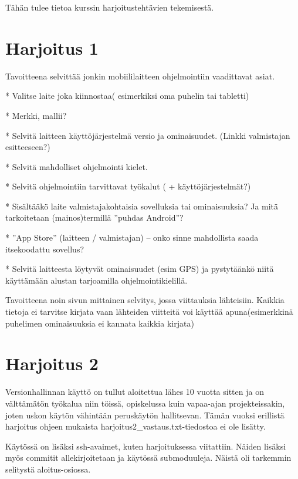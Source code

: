 
Tähän tulee tietoa kurssin harjoitustehtävien tekemisestä.


\section{Harjoitus 1}


Tavoitteena selvittää jonkin mobiililaitteen ohjelmointiin vaadittavat asiat.

* Valitse laite joka kiinnostaa( esimerkiksi oma puhelin tai tabletti)

* Merkki, mallii?

* Selvitä laitteen käyttöjärjestelmä versio ja ominaisuudet. (Linkki valmistajan esitteeseen?)

* Selvitä mahdolliset ohjelmointi kielet.

* Selvitä ohjelmointiin tarvittavat työkalut ( + käyttöjärjestelmät?)

* Sisältääkö laite valmistajakohtaisia sovelluksia tai ominaisuuksia? Ja mitä tarkoitetaan (mainos)termillä ”puhdas Android”?

* ”App Store” (laitteen / valmistajan) – onko sinne mahdollista saada itsekoodattu sovellus?

* Selvitä laitteesta löytyvät ominaisuudet (esim GPS) ja pystytäänkö niitä käyttämään alustan tarjoamilla ohjelmointikielillä.

Tavoitteena noin sivun mittainen selvitys, jossa viittauksia lähteisiin. Kaikkia tietoja ei
tarvitse kirjata vaan lähteiden viitteitä voi käyttää apuna(esimerkkinä puhelimen
ominaisuuksia ei kannata kaikkia kirjata)


\section{Harjoitus 2}

Versionhallinnan käyttö on tullut aloitettua lähes 10 vuotta sitten ja on
välttämätön työkalua niin töissä, opiskelussa kuin vapaa-ajan projekteissakin,
joten uskon käytön vähintään peruskäytön hallitsevan. Tämän vuoksi erillistä
harjoitus ohjeen mukaista harjoitus2\_vastaus.txt-tiedostoa ei ole lisätty.

Käytössä on lisäksi ssh-avaimet, kuten harjoituksessa viitattiin. Näiden
lisäksi myös commitit allekirjoitetaan ja käytössä submoduuleja. Näistä oli
tarkemmin selitystä aloitus-osiossa.

